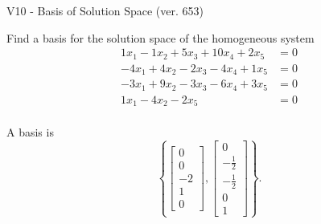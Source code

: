 \begin{exercise}
  \begin{exerciseTitle}V10 - Basis of Solution Space (ver. 653)\end{exerciseTitle}
  \begin{exerciseStatement}
    Find a basis for the solution space of the homogeneous system 
\begin{align*}
 1 x_ 1 -1 x_ 2 + 5 x_ 3 + 10 x_ 4 + 2 x_ 5 &= 0  \\ 
  -4 x_ 1 + 4 x_ 2 -2 x_ 3 -4 x_ 4 + 1 x_ 5 &= 0  \\ 
  -3 x_ 1 + 9 x_ 2 -3 x_ 3 -6 x_ 4 + 3 x_ 5 &= 0  \\ 
  1 x_ 1 -4 x_ 2 -2 x_ 5 &= 0  \\ 
 \end{align*}


 
  \end{exerciseStatement}

  \begin{exerciseAnswer}
   A basis is   
\[\left\{\left[\begin{array}{c}
0 \\
0 \\
-2 \\
1 \\
0
\end{array}\right] , \left[\begin{array}{c}
0 \\
-\frac{1}{2} \\
-\frac{1}{2} \\
0 \\
1
\end{array}\right]\right\}.\]

  


  \end{exerciseAnswer}
\end{exercise}